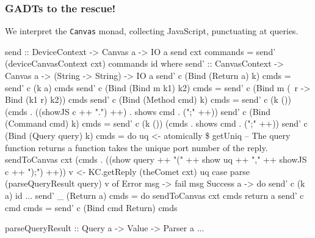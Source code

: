\documentclass{beamer}
\begin{document}
\begin{frame}[fragile]
\frametitle{GADTs to the rescue!}

We interpret the \verb|Canvas| monad, collecting JavaScript, punctuating at queries.

\begin{codeblock}[1]
\tiny
\begin{semiverbatim}
send :: DeviceContext -> Canvas a -> IO a
send cxt commands = send' (deviceCanvasContext cxt) commands id 
 where
  send' :: CanvasContext -> Canvas a -> (String -> String) -> IO a
  send' c (\alert{Bind} (\alert{Return} a) k)    cmds = send' c (k a) cmds
  send' c (\alert{Bind} (\alert{Bind} m k1) k2)  cmds = send' c (Bind m (\ r -> Bind (k1 r) k2)) cmds
  send' c (Bind (Method cmd) k) cmds = send' c (k ()) (cmds . ((showJS c ++ ".") ++) . shows cmd . (";" ++))
  send' c (Bind (Command cmd) k) cmds = send' c (k ()) (cmds . shows cmd . (";" ++))
  send' c (Bind (\alert{Query} query) k) cmds = do
      uq <- atomically \$ getUniq
      -- The query function returns a function takes the unique port number of the reply.
      sendToCanvas cxt (cmds . ((show query ++ "(" ++ show uq ++ "," ++ showJS c ++ ");") ++))
      v <- KC.getReply (theComet cxt) uq
      case parse (parseQueryResult query) v of
        Error msg -> fail msg
        Success a -> do
                send' c (k a) id
  ...
  send' _ (Return a)           cmds = do
      sendToCanvas cxt cmds
      return a
  send' c cmd                  cmds = send' c (Bind cmd Return) cmds

\alert{parseQueryResult} :: Query a -> Value -> Parser a
...
\end{semiverbatim}

\end{codeblock}

\end{frame}
\end{document}

